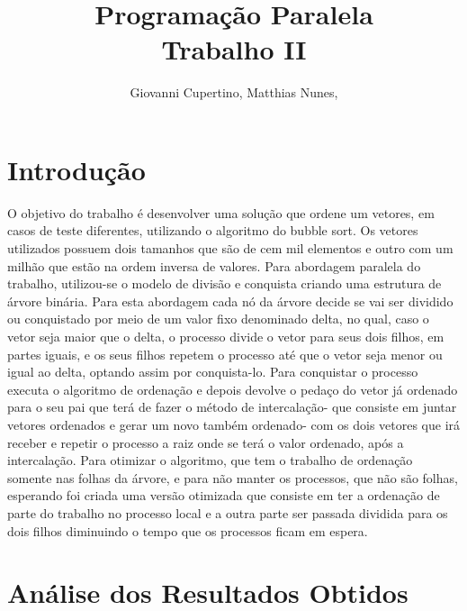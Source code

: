 \documentclass[11pt]{IEEEtran}
\title{Programação Paralela\\ Trabalho II}
\author{Giovanni Cupertino, Matthias Nunes, \IEEEmembership{Usuário pp12820}}
\begin{document}
\maketitle

\section{Introdução}

O objetivo do trabalho é desenvolver uma solução que ordene um vetores, em casos de teste diferentes, utilizando o algoritmo do bubble sort. Os vetores utilizados possuem dois tamanhos que são de cem mil elementos e outro com um milhão que estão na ordem inversa de valores. 
Para abordagem paralela do trabalho, utilizou-se o modelo de divisão e conquista criando uma estrutura de árvore binária. Para esta abordagem cada nó da árvore decide se vai ser dividido ou conquistado por meio de um valor fixo denominado delta, no qual, caso o vetor seja maior que o delta, o processo divide o vetor para seus dois filhos, em partes iguais, e os seus filhos repetem o processo até que o vetor seja menor ou igual ao delta, optando assim por conquista-lo. Para conquistar o processo executa o algoritmo de ordenação e depois devolve o pedaço do vetor já ordenado para o seu pai que terá de fazer o método de intercalação- que consiste em juntar vetores ordenados e gerar um novo também ordenado- com os dois vetores que irá receber e repetir o processo a raiz onde se terá o valor ordenado, após a intercalação.
Para otimizar o algoritmo, que tem o trabalho de ordenação somente nas folhas da árvore, e para não manter os processos, que não são folhas, esperando foi criada uma versão otimizada que consiste em ter a ordenação de parte do trabalho no processo local e a outra parte ser passada dividida para os dois filhos diminuindo o tempo que os processos ficam em espera.   



\section{Análise dos Resultados Obtidos}
\end{document}
